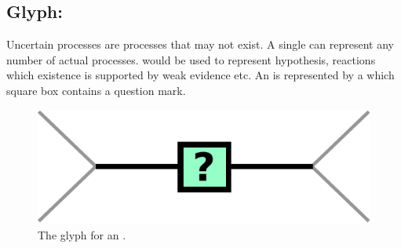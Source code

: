 \subsection{Glyph: }\label{sec:uncertain}

Uncertain processes are processes that may not exist. A single  can represent any number of actual processes.  would be used to represent hypothesis, reactions which existence is supported by weak evidence etc. An  is represented by a  which square box contains a question mark.

\begin{figure}[H]
  \centering
  \includegraphics[scale = 0.5]{images/uncertain}
  \caption{The \PD glyph for an .}
  \label{fig:uncertain}
\end{figure}

